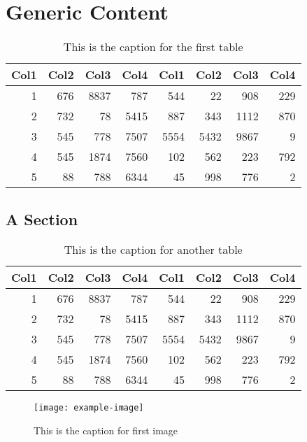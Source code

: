 \chapter{Generic Content}
    \lipsum[1]
    \begin{table}
        \centering
        \begin{tabular}{r r r r r r r r}
             Col1 & Col2 & Col3 & Col4 & Col1 & Col2 & Col3 & Col4 \\
             \hline
             1    & 676  & 8837 & 787  & 544  & 22   & 908  & 229  \\
             2    & 732  & 78   & 5415 & 887  & 343  & 1112 & 870  \\
             3    & 545  & 778  & 7507 & 5554 & 5432 & 9867 & 9    \\
             4    & 545  & 1874 & 7560 & 102  & 562  & 223  & 792  \\
             5    & 88   & 788  & 6344 & 45   & 998  & 776  & 2    \\
             \hline
        \end{tabular}
        \captionsetup{width=3.9in}
        \caption{This is the caption for the first table}
    \end{table}
    \lipsum[2]

\section{A Section}
    \lipsum[3]
    \begin{table}
        \centering
        \begin{tabular}{r r r r r r r r}
             Col1 & Col2 & Col3 & Col4 & Col1 & Col2 & Col3 & Col4 \\
             \hline
             1    & 676  & 8837 & 787  & 544  & 22   & 908  & 229  \\
             2    & 732  & 78   & 5415 & 887  & 343  & 1112 & 870  \\
             3    & 545  & 778  & 7507 & 5554 & 5432 & 9867 & 9    \\
             4    & 545  & 1874 & 7560 & 102  & 562  & 223  & 792  \\
             5    & 88   & 788  & 6344 & 45   & 998  & 776  & 2    \\
             \hline
        \end{tabular}
        \captionsetup{width=3.9in}
        \caption{This is the caption for another table}
    \end{table}
    \lipsum[4-5]
    \begin{figure}
        \centering
        \texttt{[image: example-image]}
        \captionsetup{width=3.5in}
        \caption{This is the caption for first image}
    \end{figure}

